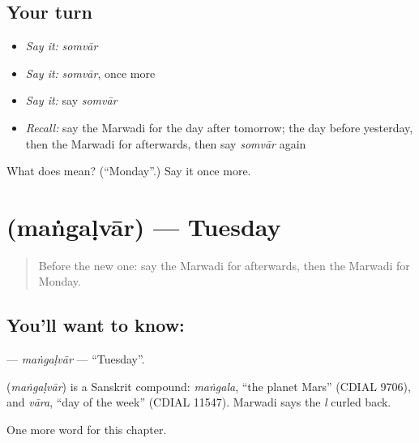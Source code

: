 \subsection*{Your turn}
\begin{itemize}
\raggedright
  \item \emph{Say it:} \emph{somvār}
  \item \emph{Say it:} \emph{somvār}, once more
  \item \emph{Say it:} say \emph{somvār}
  \item \emph{Recall:} say the Marwadi for the day after tomorrow; the day before yesterday, then the Marwadi for afterwards, then say \emph{somvār} again
\end{itemize}

\begin{tcolorbox}[breakable,colback=teal!4,colframe=teal!35!black,title={Before you move on}]
What does  mean? (\textquotedblleft{}Monday\textquotedblright{}.) Say it once more.
\end{tcolorbox}
\section[\texorpdfstring{\mw{मंगळवार} (maṅgaḷvār)}{मंगळवार (maṅgaḷvār)}]{ (maṅgaḷvār) — Tuesday}

\label{lesson:MW-C91-mangalvar}



\begin{quote}
Before the new one: say the Marwadi for afterwards, then the Marwadi for Monday.
\end{quote}

\subsection*{You'll want to know: }
\textbf{} — \emph{maṅgaḷvār} — \textquotedblleft{}Tuesday\textquotedblright{}.

\begin{cousinweb}
\textbf{} (\emph{maṅgaḷvār}) is a Sanskrit compound: \emph{maṅgala}, \textquotedblleft{}the planet Mars\textquotedblright{} (CDIAL 9706), and \emph{vāra}, \textquotedblleft{}day of the week\textquotedblright{} (CDIAL 11547). Marwadi says the \emph{l} curled back.
\end{cousinweb}

\begin{grammarlens}[title={What you've built}]
One more word for this chapter.
\end{grammarlens}

